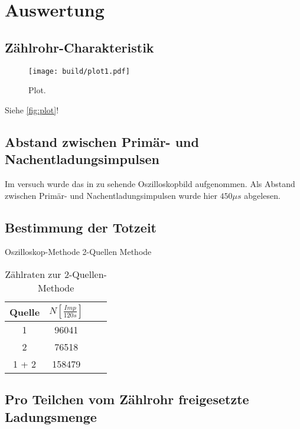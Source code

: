 \section{Auswertung}
\label{sec:Auswertung}

\subsection{Zählrohr-Charakteristik}
\begin{figure}
  \centering
  \texttt{[image: build/plot1.pdf]}
  \caption{Plot.}
  \label{fig:plot}
\end{figure}


Siehe \autoref{fig:plot}!
\subsection{Abstand zwischen Primär- und Nachentladungsimpulsen}
Im versuch wurde das in zu sehende Oszilloskopbild aufgenommen. Als Abstand zwischen Primär- und Nachentladungsimpulsen wurde hier $450 \mu s$ abgelesen.


\subsection{Bestimmung der Totzeit}
Oszilloskop-Methode
2-Quellen Methode
\begin{table}
  \centering
  \caption{Zählraten zur 2-Quellen-Methode}
\label{tab:mess2}
  \begin{tabular}{c c c c}
  \toprule
  Quelle & $N [\frac{Imp}{120s}]$ \\
  \midrule
  1     & 96041  \\
  2     & 76518 \\
  1 + 2 & 158479 \\
  \bottomrule
  \end{tabular}
  \end{table}
  \subsection{Pro Teilchen vom Zählrohr freigesetzte Ladungsmenge}
  